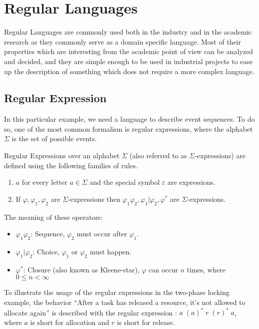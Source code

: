 	\section{Regular Languages}
	
		Regular Languages are commonly used both in the industry and in the academic research as they commonly serve as a domain specific language.
		Most of their properties which are interesting from the academic point of view can be analyzed and decided, and they are simple enough to be used in industrial projects to ease up the description of something which does not require a more complex language.
	
		\subsection{Regular Expression}
		
			In this particular example, we need a language to describe event sequences. To do so, one of the most common formalism is regular expressions, where the alphabet $\Sigma$ is the set of possible events.
	
			
			\begin{dfn}
				\label{dfn:cep:re}
				Regular Expressions over an alphabet $\Sigma$ (also referred to as $\Sigma$-expressions)
				are defined using the following families of rules.
				\begin{enumerate}
					\item $a$ for every letter $a \in \Sigma$ and the special symbol $\varepsilon$ are expressions.
					\item If $\varphi, \varphi_1, \varphi_2$ are $\Sigma$-expressions then %
						$ %
						\varphi_1 \varphi_2,
						\varphi_1 | \varphi_2,
						\varphi^\ast
						$ are $\Sigma$-expressions\citep{tre}.
				\end{enumerate}
			\end{dfn}
	
			The meaning of these operators:
			\begin{itemize}
				\item $\varphi_1 \varphi_2$: Sequence, $\varphi_2$ must occur after $\varphi_1$.
				\item $\varphi_1 | \varphi_2$: Choice, $\varphi_1$ or $\varphi_2$ must happen.
				\item $\varphi^\ast$: Closure (also known as Kleene-star), $\varphi$ can occur $n$ times, where $0 \leq n < \infty$
			\end{itemize}
			
	
			To illustrate the usage of the regular expressions in the two-phase locking example, the behavior ``After a task has released a resource, it's not allowed to allocate again'' is described with the regular expression : $a \; (a)^* \; r \; (r)^* \; a $, where $a$ is short for allocation and $r$ is short for release.
	
